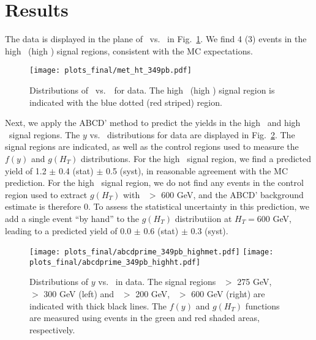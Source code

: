 \section{Results}
\label{sec:results}

The data is displayed in the plane of \MET\ vs. \Ht\ in Fig.~\ref{fig:met_ht}.
We find 4 (3) events in the high \MET\ (high \Ht) signal regions, consistent
with the MC expectations. 

\begin{figure}[tbh]
\begin{center}
\texttt{[image: plots\_final/met\_ht\_349pb.pdf]}
\caption{\label{fig:met_ht}\protect Distributions of \MET\ vs.\ \HT\   
for data. The high \MET\ (high \Ht) signal region is indicated with the
blue dotted (red striped) region.}
\end{center}
\end{figure}

Next, we apply the ABCD' method to predict the yields in the high \met\ and high \Ht\
signal regions. 
The $y$ vs. \Ht\ distributions for data are displayed in 
Fig.~\ref{fig:abcdprimedata}. 
The signal regions are indicated, as well as the control 
regions used to measure the $f(y)$ and $g(H_T)$ distributions. 
For the high \met\
signal region, we find a predicted yield of 1.2 $\pm$ 0.4 (stat) $\pm$ 0.5 (syst), 
in reasonable agreement with the MC prediction. For the high \Ht\ signal region, we 
do not find any events in the control region used to extract $g(H_T)$ with \Ht\ $>$ 600 GeV,
and the ABCD' background estimate is therefore 0. To assess the statistical uncertainty
in this prediction, we add a single event ``by hand'' to the $g(H_T)$ distributiion
at $H_T = 600$ GeV, leading to a predicted yield of 0.0 $\pm$ 0.6 (stat) $\pm$ 0.3 (syst).

\begin{figure}[hbt]
\begin{center}
\texttt{[image: plots\_final/abcdprime\_349pb\_highmet.pdf]}
\texttt{[image: plots\_final/abcdprime\_349pb\_highht.pdf]}
\caption{\label{fig:abcdprimedata}\protect 
Distributions of $y$ vs. \Ht\ in data. The signal regions \met\ $>$ 275 GeV, \Ht\ $>$ 300 GeV (left)
and \met\ $>$ 200 GeV, \Ht\ $>$ 600 GeV (right) are indicated with thick black lines. 
The $f(y)$ and $g(H_T)$ 
functions are measured using events in the green and red shaded areas, respectively.
}
\end{center}
\end{figure}

